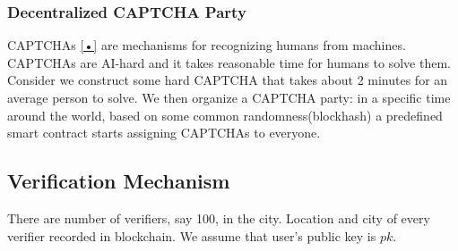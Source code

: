 \documentclass{article}
\begin{document}
\subsubsection*{ Decentralized CAPTCHA Party}
CAPTCHAs {\ref{•}} are mechanisms for recognizing humans from machines. CAPTCHAs are AI-hard and it takes reasonable time for humans to solve them. Consider we construct some hard CAPTCHA that takes about 2 minutes for an average person to solve. We then organize a CAPTCHA party: in a specific time around the world, based on some common randomness(blockhash) a predefined smart contract starts assigning CAPTCHAs to everyone. 

\subsection{Verification Mechanism}
There are number of verifiers, say 100, in the city. Location and city of every verifier recorded in blockchain. We assume that user's public key is $pk$.
\\
\end{document}
